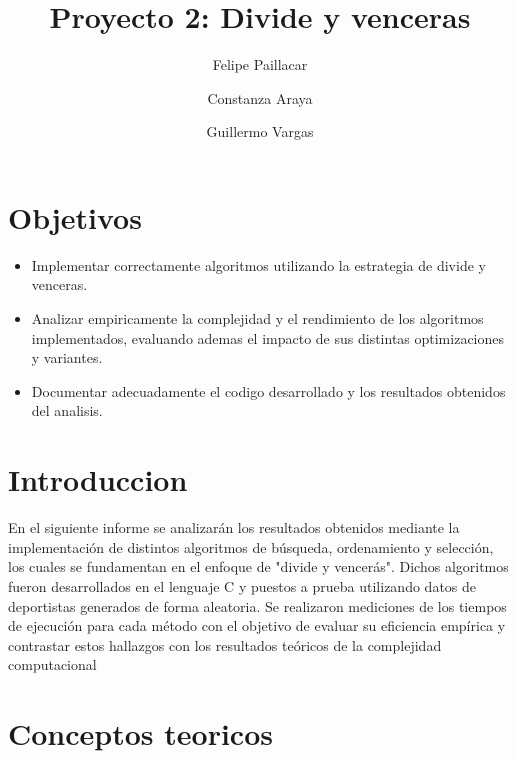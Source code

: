 \documentclass[9pt,letterpaper,onecolumn]{rho-class/rho}
\title{Proyecto 2: Divide y venceras}
\author[$\dagger$]{Felipe Paillacar}
\author[$\dagger$]{Constanza Araya}
\author[$\dagger$]{Guillermo Vargas}
\affil[1]{Docente: Jaqueline Aldridge Aguila}
\affil[2]{Diseño de algoritmos}
\affil[3]{Repositorio: \url{https://github.com/FelipePaillacar/Algoritmos-2/tree/main}}
\affil[$\dagger$]{Universidad de Magallanes}
\begin{document}
	
    \maketitle
    \thispagestyle{firststyle}
    \tableofcontents
    \newpage
\newpage
\section{Objetivos}
\begin{itemize}
    \item Implementar correctamente algoritmos utilizando la estrategia de divide y venceras.
    \item Analizar empiricamente la complejidad y el rendimiento de los algoritmos implementados, evaluando ademas el impacto de sus distintas optimizaciones y variantes.
    \item Documentar adecuadamente el codigo desarrollado y los resultados obtenidos del analisis.

\end{itemize}

\newpage
\section{Introduccion}
En el siguiente informe se analizarán los resultados obtenidos mediante la implementación de distintos algoritmos de búsqueda, ordenamiento y 
selección, los cuales se fundamentan en el enfoque de "divide y vencerás".
Dichos algoritmos fueron desarrollados en el lenguaje C y puestos a prueba utilizando datos de deportistas generados de forma aleatoria. 
Se realizaron mediciones de los tiempos de ejecución para cada método con el objetivo de evaluar su eficiencia empírica y contrastar estos 
hallazgos con los resultados teóricos de la complejidad computacional\\



\newpage
\section{Conceptos teoricos}
\end{document}
